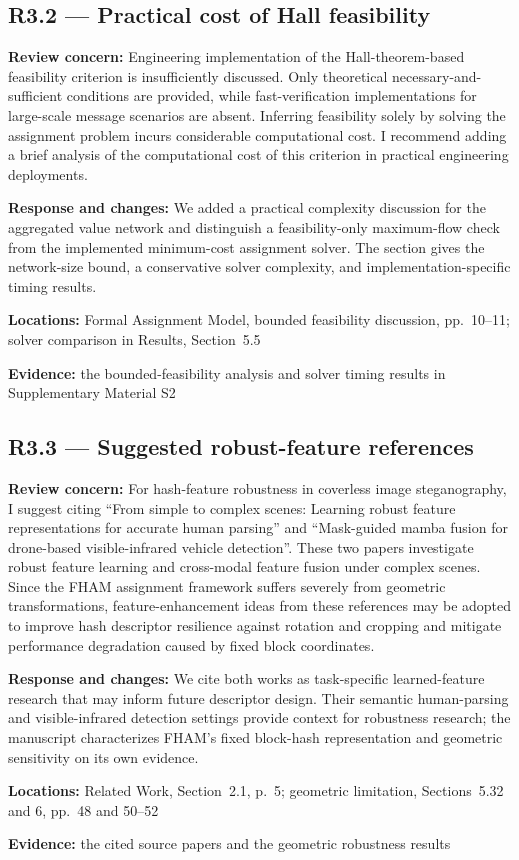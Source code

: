 \documentclass[12pt,a4paper]{article}
\newcommand{\revcomment}[1]{\par\medskip\noindent\textbf{Review concern:} #1\par\smallskip}
\newcommand{\responsechanges}[1]{\par\noindent\textbf{Response and changes:} #1\par}
\newcommand{\locations}[1]{\par\noindent\textbf{Locations:} #1\par}
\newcommand{\evidence}[1]{\par\noindent\textbf{Evidence:} #1\par\smallskip}
\begin{document}
\subsection*{R3.2 --- Practical cost of Hall feasibility}

\revcomment{Engineering implementation of the Hall-theorem-based feasibility criterion is insufficiently discussed. Only theoretical necessary-and-sufficient conditions are provided, while fast-verification implementations for large-scale message scenarios are absent. Inferring feasibility solely by solving the assignment problem incurs considerable computational cost. I recommend adding a brief analysis of the computational cost of this criterion in practical engineering deployments.}
\responsechanges{We added a practical complexity discussion for the aggregated value network and distinguish a feasibility-only maximum-flow check from the implemented minimum-cost assignment solver. The section gives the network-size bound, a conservative solver complexity, and implementation-specific timing results.}
\locations{Formal Assignment Model, bounded feasibility discussion, pp.~10--11; solver comparison in Results, Section~5.5}
\evidence{the bounded-feasibility analysis and solver timing results in Supplementary Material S2}

\subsection*{R3.3 --- Suggested robust-feature references}

\revcomment{For hash-feature robustness in coverless image steganography, I suggest citing ``From simple to complex scenes: Learning robust feature representations for accurate human parsing'' and ``Mask-guided mamba fusion for drone-based visible-infrared vehicle detection''. These two papers investigate robust feature learning and cross-modal feature fusion under complex scenes. Since the FHAM assignment framework suffers severely from geometric transformations, feature-enhancement ideas from these references may be adopted to improve hash descriptor resilience against rotation and cropping and mitigate performance degradation caused by fixed block coordinates.}
\responsechanges{We cite both works as task-specific learned-feature research that may inform future descriptor design. Their semantic human-parsing and visible-infrared detection settings provide context for robustness research; the manuscript characterizes FHAM's fixed block-hash representation and geometric sensitivity on its own evidence.}
\locations{Related Work, Section~2.1, p.~5; geometric limitation, Sections~5.32 and 6, pp.~48 and 50--52}
\evidence{the cited source papers and the geometric robustness results}
\end{document}
